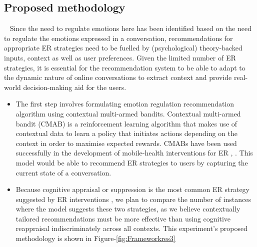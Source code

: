 \subsection{Proposed methodology}~\label{subsec:RQs}
Since the need to regulate emotions here has been identified based on the need to regulate the emotions expressed in a conversation, recommendations for appropriate ER strategies need to be fuelled by (psychological) theory-backed inputs, context as well as user preferences. Given the limited number of ER strategies, it is essential for the recommendation system to be able to adapt to the dynamic nature of online conversations to extract context and provide real-world decision-making aid for the users.
\begin{itemize}
    \item The first step involves formulating emotion regulation recommendation algorithm using contextual multi-armed bandits. Contextual multi-armed bandit (CMAB) is a reinforcement learning algorithm that makes use of contextual data to learn a policy that initiates actions depending on the context in order to maximise expected rewards. CMABs have been used successfully in the development of mobile-health interventions for ER \cite{beltzer2022building}, \cite{ameko2020offline}. This model would be able to recommend ER strategies to users by capturing the current state of a conversation.
    \item Because cognitive appraisal or suppression is the most common ER strategy suggested by ER interventions \cite{aldao2010emotion}, we plan to compare the number of instances where the model suggests these two strategies, as we believe contextually tailored recommendations must be more effective than using cognitive reappraisal indiscriminately across all contexts. This experiment's proposed methodology is shown in Figure-\ref{fig:Frameworkres3}
\end{itemize}